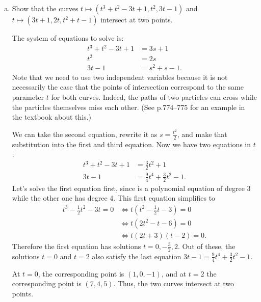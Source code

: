 \begin{problem}\leavevmode
  \begin{enumerate}[(a)]
    \item Show that the curves $t\mapsto (t^3+t^2-3t+1,t^2,3t-1)$ and $t\mapsto(3t+1,2t,t^2+t-1)$ intersect at two points.
    \begin{solution}
      The system of equations to solve is:
      \begin{align*}
        t^3+t^2-3t+1 &= 3s+1\\
        t^2 &= 2s\\
        3t-1 &= s^2+s-1.
      \end{align*}
      Note that we need to use two independent variables because it is not necessarily the case that the points of intersection correspond to the same parameter $t$ for both curves. Indeed, the paths of two particles can cross while the particles themselves miss each other. (See p.774--775 for an example in the textbook about this.)

      We can take the second equation, rewrite it as $s=\frac{t^2}2$, and make that substitution into the first and third equation. Now we have two equations in $t$:
      \begin{align*}
        t^3+t^2-3t+1 &= \frac32t^2+1\\
        3t-1 &= \frac94t^4+\frac32t^2-1.
      \end{align*}
      Let's solve the first equation first, since is a polynomial equation of degree 3 while the other one has degree 4. This first equation simplifies to
      \[\begin{split}
        t^3-\frac12t^2-3t=0 &\iff t\left(t^2-\frac12t-3\right)=0\\
        &\iff t(2t^2-t-6)=0\\
        &\iff t(2t+3)(t-2)=0.
      \end{split}\]
      Therefore the first equation has solutions $t=0,-\frac32,2$. Out of these, the solutions $t=0$ and $t=2$ also satisfy the last equation $3t-1=\frac94t^4+\frac32t^2-1$.

      At $t=0$, the corresponding point is $(1,0,-1)$, and at $t=2$ the corresponding point is $(7,4,5)$. Thus, the two curves intersect at two points.


\end{solution}
\end{enumerate}
\end{problem}

